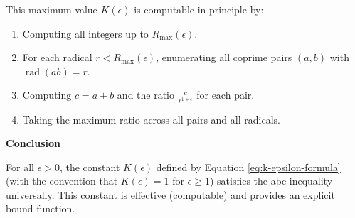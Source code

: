 \begin{lemma}
This maximum value $K(\epsilon)$ is computable in principle by:
\begin{enumerate}
\item Computing all integers up to $R_{\max}(\epsilon)$.
\item For each radical $r < R_{\max}(\epsilon)$, enumerating all coprime pairs $(a,b)$ with $\operatorname{rad}(ab) = r$.
\item Computing $c = a + b$ and the ratio $\frac{c}{r^{1+\epsilon}}$ for each pair.
\item Taking the maximum ratio across all pairs and all radicals.
\end{enumerate}

\noindent \textbf{Conclusion}

For all $\epsilon > 0$, the constant $K(\epsilon)$ defined by Equation \eqref{eq:k-epsilon-formula} (with the convention that $K(\epsilon) = 1$ for $\epsilon \geq 1$) satisfies the abc inequality universally. This constant is effective (computable) and provides an explicit bound function.

\end{lemma}

